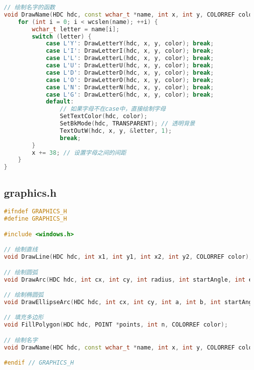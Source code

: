 \documentclass[11pt,a4paper]{article}
\begin{document}
\begin{lstlisting}[language=C++]
// 绘制名字的函数
void DrawName(HDC hdc, const wchar_t *name, int x, int y, COLORREF color) {
    for (int i = 0; i < wcslen(name); ++i) {
        wchar_t letter = name[i];
        switch (letter) {
            case L'Y': DrawLetterY(hdc, x, y, color); break;
            case L'I': DrawLetterI(hdc, x, y, color); break;
            case L'L': DrawLetterL(hdc, x, y, color); break;
            case L'U': DrawLetterU(hdc, x, y, color); break;
            case L'D': DrawLetterD(hdc, x, y, color); break;
            case L'O': DrawLetterO(hdc, x, y, color); break;
            case L'N': DrawLetterN(hdc, x, y, color); break;
            case L'G': DrawLetterG(hdc, x, y, color); break;
            default: 
                // 如果字母不在case中，直接绘制字母
                SetTextColor(hdc, color);
                SetBkMode(hdc, TRANSPARENT); // 透明背景
                TextOutW(hdc, x, y, &letter, 1); 
                break;
        }
        x += 38; // 设置字母之间的间距
    }
}

\end{lstlisting}

\subsection{graphics.h}
\begin{lstlisting}[language=C++]
#ifndef GRAPHICS_H
#define GRAPHICS_H

#include <windows.h>

// 绘制直线
void DrawLine(HDC hdc, int x1, int y1, int x2, int y2, COLORREF color);

// 绘制圆弧
void DrawArc(HDC hdc, int cx, int cy, int radius, int startAngle, int endAngle, COLORREF color);

// 绘制椭圆弧
void DrawEllipseArc(HDC hdc, int cx, int cy, int a, int b, int startAngle, int endAngle, COLORREF color);

// 填充多边形
void FillPolygon(HDC hdc, POINT *points, int n, COLORREF color);

// 绘制名字
void DrawName(HDC hdc, const wchar_t *name, int x, int y, COLORREF color);

#endif // GRAPHICS_H

\end{lstlisting}
\end{document}
